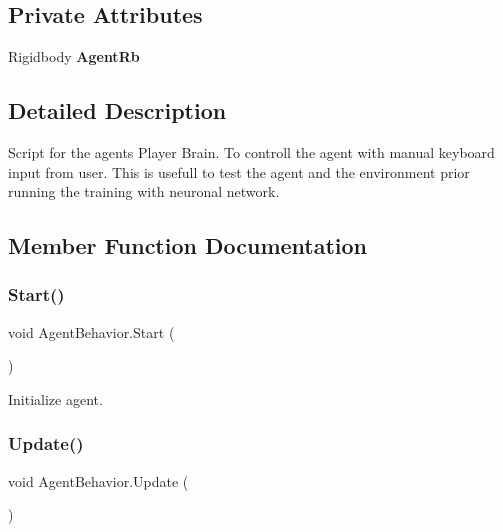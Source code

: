 \subsection*{Private Attributes}
\begin{DoxyCompactItemize}
\item 
\mbox{\label{class_agent_behavior_a6ff66b60288a0d7a694bf41fc3577654}} 
Rigidbody {\bfseries Agent\+Rb}
\end{DoxyCompactItemize}


\subsection{Detailed Description}
Script for the agents Player Brain. To controll the agent with manual keyboard input from user. This is usefull to test the agent and the environment prior running the training with neuronal network. 



\subsection{Member Function Documentation}
\mbox{\label{class_agent_behavior_a690b0d177658576951401f0be4e73bc3}} 
\subsubsection{\texorpdfstring{Start()}{Start()}}
{\footnotesize\ttfamily void Agent\+Behavior.\+Start (\begin{DoxyParamCaption}{ }\end{DoxyParamCaption})\hspace{0.3cm}{\ttfamily [private]}}



Initialize agent. 

\mbox{\label{class_agent_behavior_a3bad002ebed4854eacbbb721bc147bf2}} 
\subsubsection{\texorpdfstring{Update()}{Update()}}
{\footnotesize\ttfamily void Agent\+Behavior.\+Update (\begin{DoxyParamCaption}{ }\end{DoxyParamCaption})\hspace{0.3cm}{\ttfamily [private]}}



